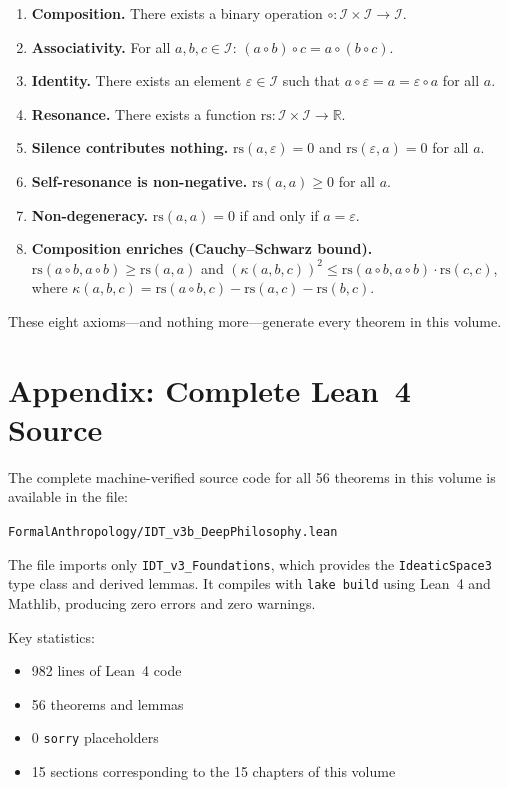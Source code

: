 \documentclass[11pt,oneside]{book}
\theoremstyle{plain}
\theoremstyle{definition}
\theoremstyle{remark}
\newcommand{\rs}{\mathrm{rs}}
\newcommand{\emerge}{\kappa}
\newcommand{\compose}{\circ}
\newcommand{\void}{\varepsilon}
\newcommand{\IS}{\mathcal{I}}
\newcommand{\R}{\mathbb{R}}
\begin{document}
\begin{enumerate}[label=\textbf{A\arabic*.}]
\item \textbf{Composition.} There exists a binary operation $\compose : \IS \times \IS \to \IS$.

\item \textbf{Associativity.} For all $a, b, c \in \IS$:
  $(a \compose b) \compose c = a \compose (b \compose c)$.

\item \textbf{Identity.} There exists an element $\void \in \IS$ such that
  $a \compose \void = a = \void \compose a$ for all $a$.

\item \textbf{Resonance.} There exists a function $\rs : \IS \times \IS \to \R$.

\item \textbf{Silence contributes nothing.}
  $\rs(a, \void) = 0$ and $\rs(\void, a) = 0$ for all $a$.

\item \textbf{Self-resonance is non-negative.}
  $\rs(a, a) \geq 0$ for all $a$.

\item \textbf{Non-degeneracy.} $\rs(a, a) = 0$ if and only if $a = \void$.

\item \textbf{Composition enriches (Cauchy--Schwarz bound).}
  $\rs(a \compose b, a \compose b) \geq \rs(a, a)$ and
  $(\emerge(a,b,c))^2 \leq \rs(a \compose b, a \compose b) \cdot \rs(c, c)$,
  where $\emerge(a,b,c) = \rs(a \compose b, c) - \rs(a,c) - \rs(b,c)$.
\end{enumerate}

\bigskip

\noindent These eight axioms---and nothing more---generate every theorem in this volume.

\chapter*{Appendix: Complete Lean~4 Source}

The complete machine-verified source code for all 56 theorems in this volume is
available in the file:

\begin{center}
\texttt{FormalAnthropology/IDT\_v3b\_DeepPhilosophy.lean}
\end{center}

\noindent The file imports only \texttt{IDT\_v3\_Foundations}, which provides the
\texttt{IdeaticSpace3} type class and derived lemmas.  It compiles with
\texttt{lake build} using Lean~4 and Mathlib, producing zero errors and zero warnings.

\noindent Key statistics:
\begin{itemize}
\item 982 lines of Lean~4 code
\item 56 theorems and lemmas
\item 0 \texttt{sorry} placeholders
\item 15 sections corresponding to the 15 chapters of this volume
\end{itemize}
\end{document}
